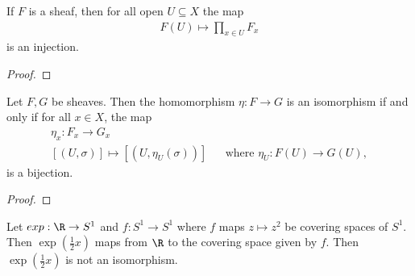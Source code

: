 \documentclass{article}
\begin{document}
\begin{lemma}
  If $F$ is a sheaf, then for all open $U \subseteq X$ the map
  \begin{align*}
    F(U) \mapsto \prod_{x \in U} F_x
  \end{align*}
  is an injection.

  \begin{proof}
    \missingproof
  \end{proof}
\end{lemma}

\begin{theorem}
  Let $F, G$ be sheaves. Then the homomorphism $\eta :F \to G$ is an isomorphism
  if and only if for all $x \in X$, the map
  \begin{align*}
    \eta_x : F_x \to G_x\\
    [(U, \sigma)] \mapsto [(U, \eta_U(\sigma))] && \text{where $\eta_U : F(U) \to G(U)$},
  \end{align*} is a bijection.

  \begin{proof}
    \missingproof
  \end{proof}
\end{theorem}

\begin{nonexample}
  Let $exp : \R \to S^1$ and $f : S^1 \to S^1$ where $f$ maps $z \mapsto z^2$ 
  be covering spaces of $S^1$. Then $\exp(\frac{1}{2}x)$ maps from $\R$ to the
  covering space given by $f$. Then $\exp(\frac{1}{2}x)$ is not an isomorphism.
\end{nonexample}

\printbibliography
\end{document}
